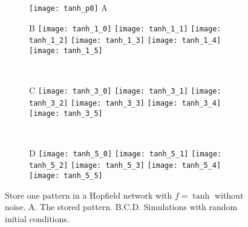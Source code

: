 \begin{figure}[H]
  \centering
  \begin{subfigure}{0.26\textwidth}
    \centering
    \texttt{[image: tanh\_p0]}
    \textsf{A}
  \end{subfigure}
  \hspace{0.7em}
  \begin{minipage}{0.64\textwidth}
    \begin{subfigure}{\textwidth}
      \textsf{B}
      \centering
      \texttt{[image: tanh\_1\_0]}
      \texttt{[image: tanh\_1\_1]}
      \texttt{[image: tanh\_1\_2]}
      \texttt{[image: tanh\_1\_3]}
      \texttt{[image: tanh\_1\_4]}
      \texttt{[image: tanh\_1\_5]}
    \end{subfigure}\\[0.6em]
    \begin{subfigure}{\textwidth}
      \textsf{C}
      \centering
      \texttt{[image: tanh\_3\_0]}
      \texttt{[image: tanh\_3\_1]}
      \texttt{[image: tanh\_3\_2]}
      \texttt{[image: tanh\_3\_3]}
      \texttt{[image: tanh\_3\_4]}
      \texttt{[image: tanh\_3\_5]}
    \end{subfigure}\\[0.6em]
    \begin{subfigure}{\textwidth}
      \textsf{D}
      \centering
      \texttt{[image: tanh\_5\_0]}
      \texttt{[image: tanh\_5\_1]}
      \texttt{[image: tanh\_5\_2]}
      \texttt{[image: tanh\_5\_3]}
      \texttt{[image: tanh\_5\_4]}
      \texttt{[image: tanh\_5\_5]}
    \end{subfigure}
  \end{minipage}
  \vspace{1.2em}
  \caption{Store one pattern in a Hopfield network with $f = \tanh$ 
           without noise.
           \textsf{A.} The stored pattern.
           \textsf{B.C.D.} Simulations with random initial conditions.}
  \label{fig: Hopfield_tanh}

\end{figure}

\newpage
\null
\vfill

